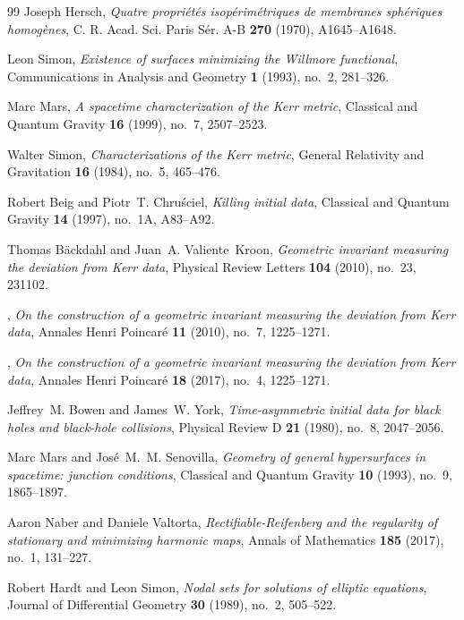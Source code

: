 \documentclass[12pt]{article}
\theoremstyle{plain}
\theoremstyle{definition}
\theoremstyle{remark}
\begin{document}
\begin{thebibliography}{99}
Joseph Hersch, \emph{Quatre propri\'et\'es isop\'erim\'etriques de membranes sph\'eriques homog\`enes}, C. R. Acad. Sci. Paris S\'er. A-B \textbf{270} (1970), A1645--A1648.

Leon Simon, \emph{Existence of surfaces minimizing the {W}illmore functional}, Communications in Analysis and Geometry \textbf{1} (1993), no.~2, 281--326.

Marc Mars, \emph{A spacetime characterization of the Kerr metric}, Classical and Quantum Gravity \textbf{16} (1999), no.~7, 2507--2523.

Walter Simon, \emph{Characterizations of the Kerr metric}, General Relativity and Gravitation \textbf{16} (1984), no.~5, 465--476.

Robert Beig and Piotr~T. Chru\'sciel, \emph{Killing initial data}, Classical and Quantum Gravity \textbf{14} (1997), no.~1A, A83--A92.

Thomas B\"ackdahl and Juan~A. Valiente~Kroon, \emph{Geometric invariant measuring the deviation from Kerr data}, Physical Review Letters \textbf{104} (2010), no.~23, 231102.

\bysame, \emph{On the construction of a geometric invariant measuring the deviation from Kerr data}, Annales Henri Poincar\'e \textbf{11} (2010), no.~7, 1225--1271.

\bysame, \emph{On the construction of a geometric invariant measuring the deviation from Kerr data}, Annales Henri Poincar\'e \textbf{18} (2017), no.~4, 1225--1271.

Jeffrey~M. Bowen and James~W. York, \emph{Time-asymmetric initial data for black holes and black-hole collisions}, Physical Review D \textbf{21} (1980), no.~8, 2047--2056.

Marc Mars and Jos\'e~M.~M. Senovilla, \emph{Geometry of general hypersurfaces in spacetime: junction conditions}, Classical and Quantum Gravity \textbf{10} (1993), no.~9, 1865--1897.

Aaron Naber and Daniele Valtorta, \emph{Rectifiable-Reifenberg and the regularity of stationary and minimizing harmonic maps}, Annals of Mathematics \textbf{185} (2017), no.~1, 131--227.

Robert Hardt and Leon Simon, \emph{Nodal sets for solutions of elliptic equations}, Journal of Differential Geometry \textbf{30} (1989), no.~2, 505--522.


\end{thebibliography}
\end{document}
